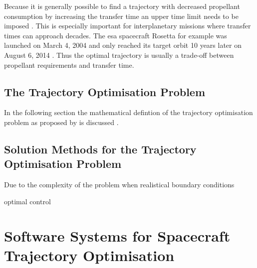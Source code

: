 Because it is generally possible to find a trajectory with decreased propellant consumption by increasing the transfer time an upper time limit needs to be imposed \autocite[p. 1]{conway-problem-2014}.
This is especially important for interplanetary missions where transfer times can approach decades.
The \ac{esa} spacecraft Rosetta for example was launched on March 4, 2004 and only reached its target orbit 10 years later on August 6, 2014 \autocite{glassmeier-rosetta-2007}.
Thus the optimal trajectory is usually a trade-off between propellant requirements and transfer time.

\subsection{The Trajectory Optimisation Problem}
\label{sec:trajectory-optimisation-problem}

In the following section the mathematical defintion of the trajectory optimisation problem as proposed by \citeauthor{betts-survey-1998} is discussed \autocite[pp. 1-2]{betts-survey-1998}.

\subsection{Solution Methods for the Trajectory Optimisation Problem}
\label{sec:solution-methods-trajectory-optimisation-problem}

Due to the complexity of the problem when realistical boundary conditions

optimal control

\section{Software Systems for Spacecraft Trajectory Optimisation}
\label{sec:software-systems-for-spacecraft-trajectory-optimisation}

\autocite{conway-elements-2014}

